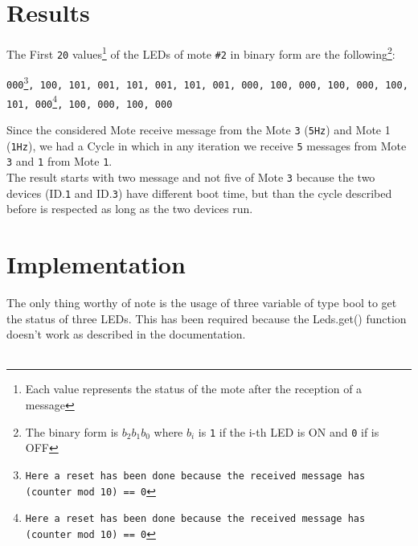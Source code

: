 \documentclass{article}
\begin{document}
        \section{Results} %
        The First \texttt{20} values\footnote{Each value represents the status of the mote after the reception of a message} of the LEDs of mote \texttt{\#2} in binary form are the following\footnote{The binary form is $b_2 b_1 b_0$  where \texttt{$b_i$} is \texttt{1} if the i-th LED is ON and \texttt{0} if is OFF }:
        \begin{center}
            \texttt{000\footnote{Here a reset has been done because the received message has \texttt{(counter mod 10) == 0}}, 100, 101, 001, 101, 001, 101, 001, 000, 100, 000, 100, 000, 100, 101, 000\footnote{Here a reset has been done because the received message has \texttt{(counter mod 10) == 0}}, 100, 000, 100, 000}
        \end{center}
        Since the considered Mote receive message from the Mote \texttt{3} (\texttt{5Hz}) and Mote 1 (\texttt{1Hz}), we had a Cycle in which in any iteration we receive \texttt{5} messages from Mote \texttt{3} and \texttt{1} from Mote \texttt{1}.\\
        The result starts with two message and not five of Mote \texttt{3} because the two devices (ID.\texttt{1} and ID.\texttt{3}) have different boot time, but than the cycle described before is respected as long as the two devices run.
        
        \section{Implementation} %
        The only thing worthy of note is the usage of three variable of type bool to get the status of three LEDs. This has been required because the Leds.get() function doesn't work as described in the documentation.
		\\\\\pagebreak
		\pagebreak
		\clearpage
\end{document}
